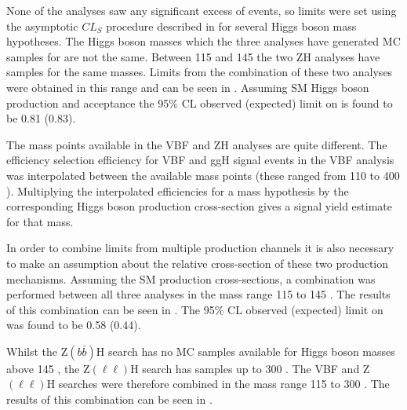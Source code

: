 None of the analyses saw any significant excess of events, so limits were set using the asymptotic $CL_{S}$ procedure described in  for several Higgs boson mass hypotheses. The Higgs boson masses which the three analyses have generated \ac{MC} samples for are not the same. Between 115 and 145 \GeV the two ZH analyses have samples for the same masses. Limits from the combination of these two analyses were obtained in this range and can be seen in . Assuming \ac{SM} Higgs boson production and acceptance the 95\% \ac{CL} observed (expected) limit on \BRinv is found to be 0.81 (0.83).

The mass points available in the \ac{VBF} and ZH analyses are quite different. The efficiency selection efficiency for \ac{VBF} and \ac{ggH} signal events in the \ac{VBF} analysis was interpolated between the available mass points (these ranged from 110 to 400 \GeV). Multiplying the interpolated efficiencies for a mass hypothesis by the corresponding Higgs boson production cross-section gives a signal yield estimate for that mass. 

In order to combine limits from multiple production channels it is also necessary to make an assumption about the relative cross-section of these two production mechanisms. Assuming the \ac{SM} production cross-sections, a combination was performed between all three analyses in the mass range 115 to 145 \GeV. The results of this combination can be seen in . The 95\% \ac{CL} observed (expected) limit on \BRinv was found to be 0.58 (0.44).

Whilst the Z$(b\bar{b})$H search has no \ac{MC} samples available for Higgs boson masses above 145 \GeV, the Z$(\ell\ell)$H search has samples up to 300 \GeV. The \ac{VBF} and Z$(\ell\ell)$H searches were therefore combined in the mass range 115 to 300 \GeV. The results of this combination can be seen in .

